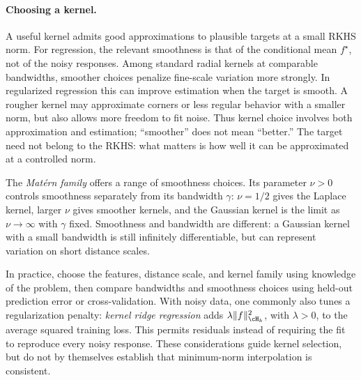 \documentclass[11pt,twoside]{article}
\theoremstyle{definition}
\theoremstyle{remark}
\begin{document}
\paragraph{Choosing a kernel.}
A useful kernel admits good approximations to plausible targets at a small
RKHS norm. For regression, the relevant smoothness is that of the
conditional mean $f^\star$, not of the noisy responses. Among standard
radial kernels at comparable bandwidths, smoother choices penalize
fine-scale variation more strongly.
In regularized regression this can improve estimation when the target is
smooth. A rougher kernel may approximate corners or less regular behavior
with a smaller norm, but also allows more freedom to fit noise. Thus kernel
choice involves both approximation and estimation; ``smoother'' does not
mean ``better.'' The target need not belong to the RKHS: what matters is
how well it can be approximated at a controlled norm.

The \emph{Mat\'ern family} offers a range of smoothness choices. Its
parameter $\nu>0$ controls smoothness separately from its bandwidth
$\gamma$: $\nu=1/2$ gives the Laplace kernel, larger $\nu$ gives smoother
kernels, and the Gaussian kernel is the limit as $\nu\to\infty$ with
$\gamma$ fixed. Smoothness and bandwidth are different: a Gaussian kernel
with a small bandwidth is still infinitely differentiable, but can
represent variation on short distance scales.

In practice, choose the features, distance scale, and kernel family using
knowledge of the problem, then compare bandwidths and smoothness choices
using held-out prediction error or cross-validation. With noisy data,
one commonly also tunes a regularization penalty:
\emph{kernel ridge regression} adds $\lambda\|f\|_{\cH_k}^2$, with
$\lambda>0$, to the average squared training loss. This permits residuals
instead of requiring the fit to reproduce every noisy response. These
considerations guide kernel selection, but do not by themselves establish
that minimum-norm interpolation is consistent.
\end{document}
